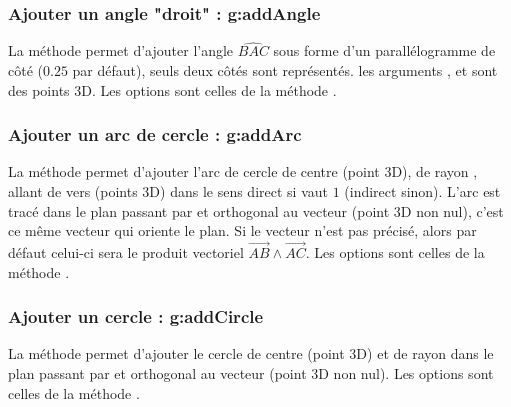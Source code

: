 \subsubsection{Ajouter un angle "droit" : g:addAngle}

La méthode  permet d'ajouter l'angle $\widehat{BAC}$ sous forme d'un parallélogramme de côté  ($0.25$ par défaut), seuls deux côtés sont représentés. les arguments ,  et  sont des points 3D. Les options sont celles de la méthode .

\subsubsection{Ajouter un arc de cercle : g:addArc}

La méthode  permet d'ajouter l'arc de cercle de centre  (point 3D), de rayon , allant de  vers  (points 3D) dans le sens direct si  vaut $1$ (indirect sinon). L'arc est tracé dans le plan passant par  et orthogonal au vecteur (point 3D non nul), c'est ce même vecteur qui oriente le plan. Si le vecteur  n'est pas précisé, alors par défaut celui-ci sera le produit vectoriel $\vec{AB}\wedge\vec{AC}$. Les options sont celles de la méthode .

\subsubsection{Ajouter un cercle : g:addCircle}

La méthode  permet d'ajouter le cercle de centre  (point 3D) et de rayon  dans le plan passant par  et orthogonal au vecteur (point 3D non nul). Les options sont celles de la méthode .

